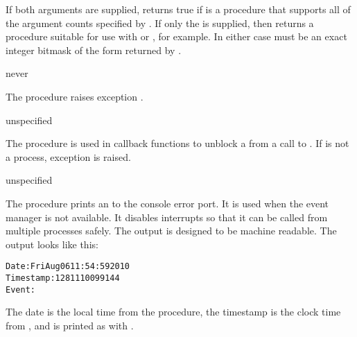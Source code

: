 If both arguments are supplied,  returns true if
 is a procedure that supports all of the argument counts specified by
.
If only the  is supplied, then 
returns a procedure 
suitable for use with  or , for example.
In either case  must be an exact integer bitmask of the
form returned by .

\begin{procedure}
\end{procedure}
\returns{} never

The  procedure raises exception .

\begin{procedure}
\end{procedure}
\returns{} unspecified

The  procedure is used in callback functions to
unblock a  from a call to . If
 is not a process, exception  is raised.

\begin{procedure}
\end{procedure}
\returns{} unspecified

The  procedure prints an  to
the console error port. It is used when the event manager is not
available. It disables interrupts so that it can be called from
multiple processes safely.  The output is designed to be machine
readable. The output looks like this:

\begin{alltt}
Date: Fri Aug 06 11:54:59 2010
Timestamp: 1281110099144
Event: 
\end{alltt}

The date is the local time from the  procedure,
the timestamp is the clock time from , and
 is printed as with .

